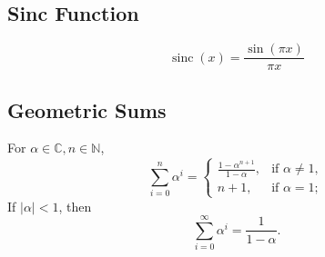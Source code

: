 \documentclass{article}
\begin{document}
\subsection{Sinc Function}
\begin{definition}
    \begin{equation*}
        \operatorname{sinc}(x) = \frac{\sin(\pi x)}{\pi x}
    \end{equation*}
\end{definition}

\subsection{Geometric Sums}
\begin{definition}
    For \( \alpha \in \mathbb{C}, n \in \mathbb{N} \),
    \begin{equation*}
        \sum_{i=0}^{n} \alpha^i = 
        \begin{cases} 
            \frac{1 - \alpha^{n+1}}{1 - \alpha}, & \text{if } \alpha \neq 1, \\ 
            n + 1, & \text{if } \alpha = 1;
        \end{cases}
    \end{equation*}
    If \( |\alpha| < 1 \), then
    \begin{equation*}
        \sum_{i=0}^{\infty} \alpha^i = \frac{1}{1 - \alpha}.
    \end{equation*}
\end{definition}

\end{document}
